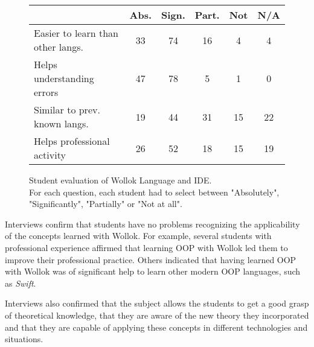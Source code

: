 \begin{figure}[ht]
 \centering
 \footnotesize
 \begin{tabular}{|p{13em}|c|c|c|c|c|}
 	\hline
 	& Abs. & Sign. & Part. & Not & N/A \\
 	\hline
 	Easier to learn than other langs. & 33 & 74 & 16 & 4 & 4 \\
 	Helps understanding errors & 47 & 78 & 5 & 1 & 0 \\
 	Similar to prev. known langs. & 19 & 44 & 31 & 15 & 22 \\
 	Helps professional activity & 26 & 52 & 18 & 15 & 19 \\
 	\hline
 
 \end{tabular}

\vspace{-2mm}
\caption{\small Student evaluation of Wollok Language and IDE. \\
\small For each question, each student had to select between "Absolutely", "Significantly", "Partially" or "Not at all".}
\label{fig:surveys/languageAppreciation}
\vspace{-3mm}
\end{figure}

Interviews confirm that students have no problems recognizing the applicability of the concepts learned with Wollok.
For example, several students with professional experience affirmed that 
learning OOP with Wollok led them to improve their professional practice.
Others indicated that having learned OOP with Wollok was of significant help 
to learn other modern OOP languages, such as \emph{Swift}.


Interviews also confirmed that the subject allows the students to get a good grasp of theoretical knowledge, 
that they are aware of the new theory they incorporated
and that they are capable of applying these concepts in different technologies and situations.

